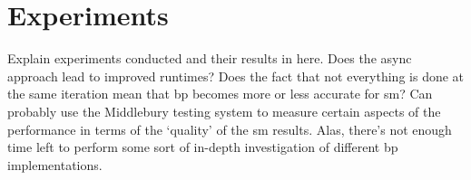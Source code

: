 \chapter{Experiments}
Explain experiments conducted and their results in here.  Does the async approach lead to improved runtimes?  Does the fact that not everything is done at the same iteration mean that \gls{bp} becomes more or less accurate for \gls{sm}?  Can probably use the Middlebury testing system to measure certain aspects of the performance in terms of the `quality' of the \gls{sm} results.  Alas, there's not enough time left to perform some sort of in-depth investigation of different \gls{bp} implementations.